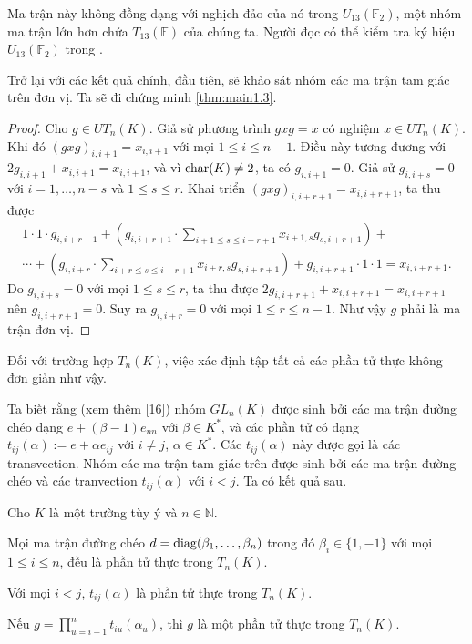 Ma trận này không đồng dạng với nghịch đảo của nó trong $U_{13}(\mathbb{F}_2)$, một nhóm ma trận lớn hơn chứa $T_{13}(\mathbb{F})$ của chúng ta. Người đọc có thể kiểm tra ký hiệu $U_{13}(\mathbb{F}_2)$ trong \cite{IsaacsKaraguezian1998}.

Trở lại với các kết quả chính, đầu tiên, sẽ khảo sát nhóm các ma trận tam giác trên đơn vị. Ta sẽ đi chứng minh \cref{thm:main1.3}.

\begin{proof}
Cho $g\in UT_n(K)$. Giả sử phương trình $gxg=x$ có nghiệm $x\in UT_n(K)$. Khi đó $(gxg)_{i,i+1}=x_{i,i+1}$ với mọi $1\le i\le n-1$. Điều này tương đương với $2g_{i,i+1}+x_{i,i+1}=x_{i,i+1}$, và vì $\operatorname{char}(K)\neq2$, ta có $g_{i,i+1}=0$. Giả sử $g_{i,i+s} = 0$ với $i=1,\dots,n-s$ và $1\leq s\leq r$. Khai triển $(gxg)_{i,i+r+1}=x_{i,i+r+1}$, ta thu được
\begin{gather*}
    1\cdot1\cdot g_{i,i+r+1} + \left(g_{i,i+r+1}\cdot\sum_{i+1\leq s\leq i+r+1}x_{i+1,s}g_{s,i+r+1}\right) + \\
    \cdots + \left(g_{i,i+r}\cdot\sum_{i+r\leq s\leq i+r+1}x_{i+r,s}g_{s,i+r+1}\right) + g_{i,i+r+1}\cdot1\cdot1 = x_{i,i+r+1}.
\end{gather*}
Do $g_{i,i+s}=0$ với mọi $1\leq s\leq r$, ta thu được $2g_{i,i+r+1}+x_{i,i+r+1}=x_{i,i+r+1}$ nên $g_{i,i+r+1}=0$. Suy ra $g_{i,i+r}=0$ với mọi $1\leq r\leq n-1$. Như vậy $g$ phải là ma trận đơn vị.
\end{proof}

Đối với trường hợp $T_n(K)$, việc xác định tập tất cả các phần tử thực không đơn giản như vậy.

Ta biết rằng (xem thêm [16]) nhóm $GL_n(K)$ được sinh bởi các ma trận đường chéo dạng $e+(\beta-1)e_{nn}$ với $\beta\in K^*$, và các phần tử có dạng $t_{ij}(\alpha):=e+\alpha e_{ij}$ với $i\neq j$, $\alpha\in K^*$. Các $t_{ij}(\alpha)$ này được gọi là các transvection. Nhóm các ma trận tam giác trên được sinh bởi các ma trận đường chéo và các tranvection $t_{ij}(\alpha)$ với $i<j$. Ta có kết quả sau.

\begin{prop}\label{prop:transvections}
Cho $K$ là một trường tùy ý và $n \in \mathbb{N}$.
\begin{thmenum}
    \item Mọi ma trận đường chéo $d = {\rm diag}(\beta_1, \dots, \beta_n)$ trong đó $\beta_i \in \{1, -1\}$ với mọi $1\leq i\leq n$, đều là phần tử thực trong $T_n(K)$.
    \item Với mọi $i<j$, $t_{ij}(\alpha)$ là phần tử thực trong $T_n(K)$.
    \item Nếu $g = \prod_{u=i+1}^{n} t_{iu}(\alpha_u)$, thì $g$ là một phần tử thực trong $T_n(K)$.
\end{thmenum}
\end{prop}

